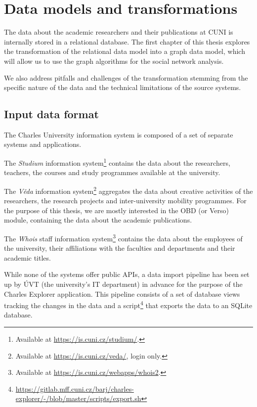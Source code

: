 \chapter{Data models and transformations}

The data about the academic researchers and their publications at \ac{CUNI} is internally stored in a relational database. 
The first chapter of this thesis explores the transformation of the relational data model into a graph data model, 
which will allow us to use the graph algorithms for the social network analysis.

We also address pitfalls and challenges of the transformation stemming 
from the specific nature of the data and the technical limitations of the source systems.

\section{Input data format}

The Charles University information system is composed of a set of separate systems and applications.

The \textit{Studium} information system\footnote{Available at \url{https://is.cuni.cz/studium/}.} contains the data about the researchers, teachers, the courses and study programmes available at the university.

The \textit{Věda} information system\footnote{Available at \url{https://is.cuni.cz/veda/}, login only.} aggregates the data about creative activities of the researchers, the research projects and inter-university mobility programmes.
For the purpose of this thesis, we are mostly interested in the \ac{OBD} (or Verso) module, containing the data about the academic publications.

The \textit{Whois} staff information system\footnote{Available at \url{https://is.cuni.cz/webapps/whois2}.} contains the data about the employees of the university, 
their affiliations with the faculties and departments and their academic titles.

While none of the systems offer public APIs, a data import pipeline has been set up by \ac{ÚVT} (the university's IT department) in advance
for the purpose of the Charles Explorer application. 
This pipeline consists of a set of database views tracking the changes in the data and a script\footnote{\url{https://gitlab.mff.cuni.cz/barj/charles-explorer/-/blob/master/scripts/export.sh}} that exports the data to an SQLite database.


